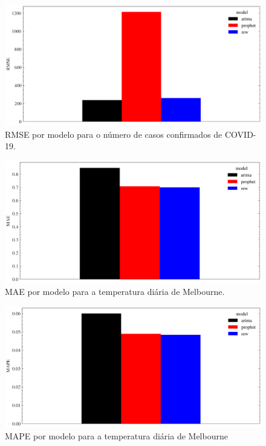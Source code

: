 \begin{figure}[!htp]
    \centering
    \includegraphics[width=5.0in]{img/covid_rmse_comparison.pdf}
    \caption{RMSE por modelo para o número de casos confirmados de COVID-19.}
\end{figure}

\begin{figure}[!htp]
    \centering
    \includegraphics[width=5.0in]{img/temperatures_mae_comparison.pdf}
    \caption{MAE por modelo para a temperatura diária de Melbourne.}
\end{figure}

\begin{figure}[!htp]
    \centering
    \includegraphics[width=5.0in]{img/temperatures_mape_comparison.pdf}
    \caption{MAPE por modelo para a temperatura diária de Melbourne}
\end{figure}

